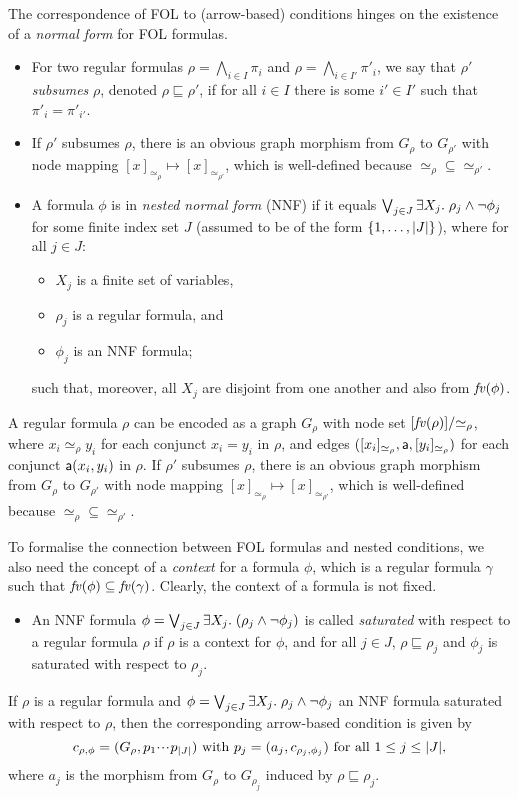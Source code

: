 The correspondence of FOL to (arrow-based) conditions hinges on the existence of a \emph{normal form} for FOL formulas.
%
\begin{itemize}
\item For two regular formulas $\rho=\bigwedge_{i\in I} \pi_i$ and $\rho=\bigwedge_{i\in I'} \pi'_i$, we say that $\rho'$ \emph{subsumes} $\rho$, denoted $\rho\sqsubseteq \rho'$, if for all $i\in I$ there is some $i'\in I'$ such that $\pi'_i=\pi'_{i'}$.

\item If $\rho'$ subsumes $\rho$, there is an obvious graph morphism from $G_\rho$ to $G_{\rho'}$ with node mapping $[x]_{\simeq_\rho}\mapsto [x]_{\simeq_{\rho'}}$, which is well-defined because ${\simeq_\rho}\subseteq {\simeq_{\rho'}}$.

\item A formula $\phi$ is in \emph{nested normal form} (NNF) if it equals $\bigvee_{j\in J} \exists X_j.\; \rho_j\wedge\neg \phi_j$ for some finite index set $J$ (assumed to be of the form $\{{1,\ldots,|J|}\}$), where for all $j\in J$:
\begin{itemize}
\item $X_j$ is a finite set of variables,
\item $\rho_j$ is a regular formula, and
\item $\phi_j$ is an NNF formula;
\end{itemize}
such that, moreover, all $X_j$ are disjoint from one another and also from $\mathit{fv}(\phi)$.
\end{itemize}
%
A regular formula $\rho$ can be encoded as a graph $G_\rho$ with node set $[\mathit{fv}(\rho)]/{\simeq_\rho}$, where $x_i\simeq_\rho y_i$ for each conjunct $x_i=y_i$ in $\rho$, and edges $([x_i]_{\simeq_\rho},\mathsf{a},[y_i]_{\simeq_\rho})$ for each conjunct $\mathsf{a}(x_i,y_i)$ in $\rho$. If $\rho'$ subsumes $\rho$, there is an obvious graph morphism from $G_\rho$ to $G_{\rho'}$ with node mapping $[x]_{\simeq_\rho}\mapsto [x]_{\simeq_{\rho'}}$, which is well-defined because ${\simeq_\rho}\subseteq {\simeq_{\rho'}}$.

To formalise the connection between FOL formulas and nested conditions, we also need the concept of a \emph{context} for a formula $\phi$, which is a regular formula $\gamma$ such that $\mathit{fv}(\phi)\subseteq \mathit{fv}(\gamma)$. Clearly, the context of a formula is not fixed.
%
\begin{itemize}
\item An NNF formula $\phi=\bigvee_{j\in J} \exists X_j.\; (\rho_j\wedge\neg \phi_j)$ is called \emph{saturated} with respect to a regular formula $\rho$ if $\rho$ is a context for $\phi$, and for all $j\in J$, $\rho\sqsubseteq \rho_j$ and $\phi_j$ is saturated with respect to $\rho_j$.
\end{itemize}
%
If $\rho$ is a regular formula and $\phi=\bigvee_{j\in J} \exists X_j.\; \rho_j\wedge\neg \phi_j$ an NNF formula saturated with respect to $\rho$, then the corresponding arrow-based condition is given by
\[ c_{\rho,\phi}=(G_\rho,p_1{\cdotp\mkern-2mu\cdotp\mkern-2mu\cdotp\mkern1mu} p_{|J|}) \text{ with } p_j=(a_j,c_{\rho_j,\phi_j}) \text{ for all $1\leq j\leq |J|$,}
\]
where $a_j$ is the morphism from $G_\rho$ to $G_{\rho_j}$ induced by $\rho\sqsubseteq \rho_j$.
\fi
